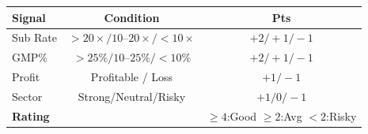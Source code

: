 \documentclass{article}
\newcommand{\smallfont}{\fontsize{18}{22}\selectfont}
\newcommand{\colsep}{\hspace{0.008\linewidth}}
\begin{document}
\begin{minipage}[t]{0.315\linewidth}
\begin{tcolorbox}[sbox, title={[6] Methodology}]
\renewcommand{\arraystretch}{1.2}
\begin{center}
\smallfont
\begin{tabular}{lcc}
\toprule
\textbf{Signal} & \textbf{Condition} & \textbf{Pts}\\
\midrule
Sub Rate & $>20\times/10$--$20\times/<10\times$ & $+2/+1/-1$\\
GMP\%    & $>25\%/10$--$25\%/<10\%$ & $+2/+1/-1$\\
Profit   & Profitable / Loss & $+1/-1$\\
Sector   & Strong/Neutral/Risky & $+1/0/-1$\\
\midrule
\multicolumn{2}{l}{\textbf{Rating}} & $\ge4$:Good $\ge2$:Avg $<2$:Risky\\
\bottomrule
\end{tabular}
\end{center}
\end{tcolorbox}

\end{minipage}\colsep%
\end{document}
